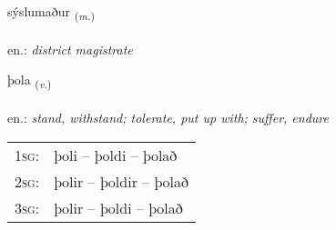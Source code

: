 \documentclass[frontgrid, backgrid]{flacards}\usepackage[]{graphicx}\usepackage[]{xcolor}
\begin{document}
\renewcommand{\flhead}{\vskip5pt \fboxsep=0pt {\small\bfseries\footnotesize Nafnorð | Noun}}
\renewcommand{\fcfoot}{\vskip5pt \fboxsep=0pt \hspace{2pt}{\small\bfseries\footnotesize 2K}}

\renewcommand{\blhead}{\vskip5pt {\small\bfseries\footnotesize Nafnorð | Noun }}
\renewcommand{\bcfoot}{\vskip5pt \hspace{2pt}{\small\bfseries\footnotesize 2K}}


{sýslumaður \small{\textsubscript{(\textit{m.})}} \\[1ex] %
\textphonetic{[sistlʏmaðʏr]} \\
en.: \emph{district magistrate} \\  [2ex]
\renewcommand*{\arraystretch}{0.8}
}

\renewcommand{\flhead}{\vskip5pt \fboxsep=0pt {\small\bfseries\footnotesize Sagnorð | Verb}}
\renewcommand{\fcfoot}{\vskip5pt \fboxsep=0pt \hspace{2pt}{\small\bfseries\footnotesize 2K}}

\renewcommand{\blhead}{\vskip5pt {\small\bfseries\footnotesize Sagnorð | Verb }}
\renewcommand{\bcfoot}{\vskip5pt \hspace{2pt}{\small\bfseries\footnotesize 2K}}


{þola \small{\textsubscript{(\textit{v.})}} \\[1ex] %
\textphonetic{[θɔːla]} \\
en.: \emph{stand, withstand; tolerate, put up with; suffer, endure} \\  [2ex]
\renewcommand*{\arraystretch}{0.8}
\begin{tabular}{p{1cm}l}
\textsc{1sg}: & þoli -- þoldi -- þolað \\ 
\textsc{2sg}: & þolir -- þoldir -- þolað \\ 
\textsc{3sg}: & þolir -- þoldi -- þolað \\ 
\end{tabular}
}
\end{document}
